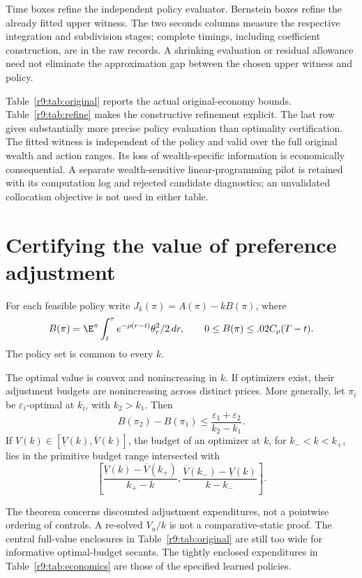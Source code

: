 \begin{table}[t]
\centering\scriptsize
\caption{Executed refinement for the $k=2$ certificate}\label{r9:tab:refine}

\par\smallskip\footnotesize Time boxes refine the independent policy evaluator. Bernstein boxes refine the already fitted upper witness. The two seconds columns measure the respective integration and subdivision stages; complete timings, including coefficient construction, are in the raw records. A shrinking evaluation or residual allowance need not eliminate the approximation gap between the chosen upper witness and policy.
\end{table}

Table~\ref{r9:tab:original} reports the actual original-economy bounds. Table~\ref{r9:tab:refine} makes the constructive refinement explicit. The last row gives substantially more precise policy evaluation than optimality certification. The fitted witness is independent of the policy and valid over the full original wealth and action ranges. Its loss of wealth-specific information is economically consequential. A separate wealth-sensitive linear-programming pilot is retained with its computation log and rejected candidate diagnostics; an unvalidated collocation objective is not used in either table.

\section{Certifying the value of preference adjustment}\label{r9:economics}
For each feasible policy write $J_k(\pi)=A(\pi)-kB(\pi)$, where
\[
 B(\pi)=\E^\pi\int_t^\tau e^{-\rho(r-t)}\theta_r^2/2\,dr,
 \qquad 0\leq B(\pi)\leq .02C_\rho(T-t).
\]
The policy set is common to every $k$.
\begin{theorem}\label{r9:cost}
The optimal value is convex and nonincreasing in $k$. If optimizers exist, their adjustment budgets are nonincreasing across distinct prices. More generally, let $\pi_i$ be $\varepsilon_i$-optimal at $k_i$, with $k_2>k_1$. Then
\begin{equation}
 B(\pi_2)-B(\pi_1)\leq\frac{\varepsilon_1+\varepsilon_2}{k_2-k_1}.\label{r9:reversal}
\end{equation}
If $V(k)\in[\underline V(k),\overline V(k)]$, the budget of an optimizer at $k$, for $k_-<k<k_+$, lies in the primitive budget range intersected with
\begin{equation}
 \left[\frac{\underline V(k)-\overline V(k_+)}{k_+-k},
       \frac{\overline V(k_-)-\underline V(k)}{k-k_-}\right].\label{r9:secant}
\end{equation}
\end{theorem}
The theorem concerns discounted adjustment expenditures, not a pointwise ordering of controls. A re-solved $V_u/k$ is not a comparative-static proof. The central full-value enclosures in Table~\ref{r9:tab:original} are still too wide for informative optimal-budget secants. The tightly enclosed expenditures in Table~\ref{r9:tab:economics} are those of the specified learned policies.

